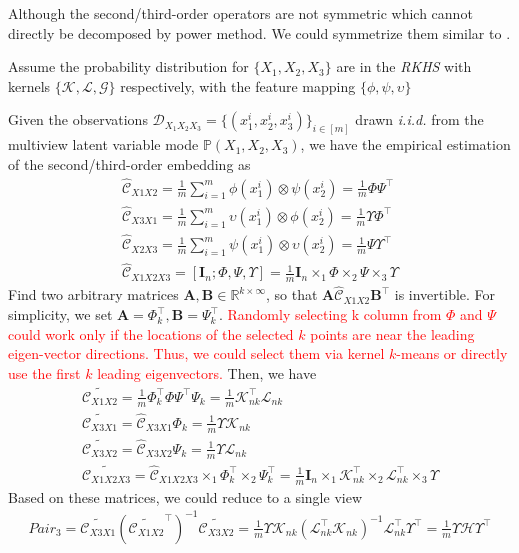 \documentclass[11pt]{article}
\newcommand{\trans}{\top}
\newcommand{\bm}{\mathbf}
\begin{document}
Although the second/third-order operators are not symmetric which cannot directly be decomposed by power method. We could symmetrize them similar to \cite{Anima12}.

Assume the probability distribution for $\{X_1, X_2, X_3\}$ are in the \textit{RKHS} with kernels $\{\mathcal{K, L, G}\}$ respectively, with the feature mapping $\{\phi,\psi, \upsilon\}$

Given the observations $\mathcal{D}_{X_1X_2X_3}=\{(x_1^i, x_2^i, x_3^i)\}_{i\in[m]}$ drawn \emph{i.i.d.} from the multiview latent variable mode $\mathbb{P}(X_1, X_2, X_3)$, we have the empirical estimation of the second/third-order embedding as
%
\begin{eqnarray*}
\hat{\mathcal{C}}_{X1X2} = \frac{1}{m} \sum_{i=1}^m \phi(x_1^i)\otimes \psi(x_2^i) = \frac{1}{m}\Phi \Psi^\trans\\
\hat{\mathcal{C}}_{X3X1} = \frac{1}{m} \sum_{i=1}^m \upsilon(x_1^i)\otimes \phi(x_2^i) = \frac{1}{m}\Upsilon \Phi^\trans\\
\hat{\mathcal{C}}_{X2X3} = \frac{1}{m} \sum_{i=1}^m \psi(x_1^i)\otimes \upsilon(x_2^i) = \frac{1}{m}\Psi \Upsilon^\trans\\
\hat{\mathcal{C}}_{X1X2X3} = [\bm{I}_n; \Phi, \Psi, \Upsilon] =
\frac{1}{m}\bm{I}_n \times_1 \Phi \times_2 \Psi \times_3 \Upsilon
\end{eqnarray*}
%
Find two arbitrary matrices $\bm{A,B}\in \mathbb{R}^{k \times \infty}$, so that $\bm{A}\hat{\mathcal{C}}_{X1X2}\bm{B}^\trans$ is invertible. For simplicity, we set $\bm{A} = \Phi_k^\trans, \bm{B} = \Psi_k^\trans$. \textcolor{red}{Randomly selecting k column from $\Phi$ and $\Psi$ could work only if the locations of the selected $k$ points are near the leading eigen-vector directions. Thus, we could select them via kernel $k$-means or directly use the first $k$ leading eigenvectors.} Then, we have
%
\begin{eqnarray*}
\widetilde{\mathcal{C}_{X1X2}} = \frac{1}{m}\Phi_k^\trans\Phi\Psi^\trans\Psi_k = \frac{1}{m}\mathcal{K}_{nk}^\trans\mathcal{L}_{nk}\\
\widetilde{\mathcal{C}_{X3X1}} = \hat{\mathcal{C}}_{X3X1}\Phi_k = \frac{1}{m}\Upsilon\mathcal{K}_{nk}\\
\widetilde{\mathcal{C}_{X3X2}} = \hat{\mathcal{C}}_{X3X2}\Psi_k = \frac{1}{m}\Upsilon\mathcal{L}_{nk}\\
\widetilde{\mathcal{C}_{X1X2X3}} =
\hat{\mathcal{C}}_{X1X2X3}\times_1\Phi_k^\trans
\times_2\Psi_k^\trans = \frac{1}{m} \bm{I}_n \times_1
\mathcal{K}_{nk}^\trans \times_2 \mathcal{L}_{nk}^\trans \times_3
\Upsilon
\end{eqnarray*}
%
Based on these matrices, we could reduce to a single view
%
\begin{eqnarray*}
Pair_3 =
\widetilde{\mathcal{C}_{X3X1}}(\widetilde{\mathcal{C}_{X1X2}}^\trans)^{-1}\widetilde{\mathcal{C}_{X3X2}}
=
\frac{1}{m}\Upsilon\mathcal{K}_{nk}(\mathcal{L}_{nk}^\trans\mathcal{K}_{nk})^{-1}\mathcal{L}_{nk}^\trans\Upsilon^\trans = \frac{1}{m}\Upsilon\mathcal{H}\Upsilon^\trans
\end{eqnarray*}
\end{document}
